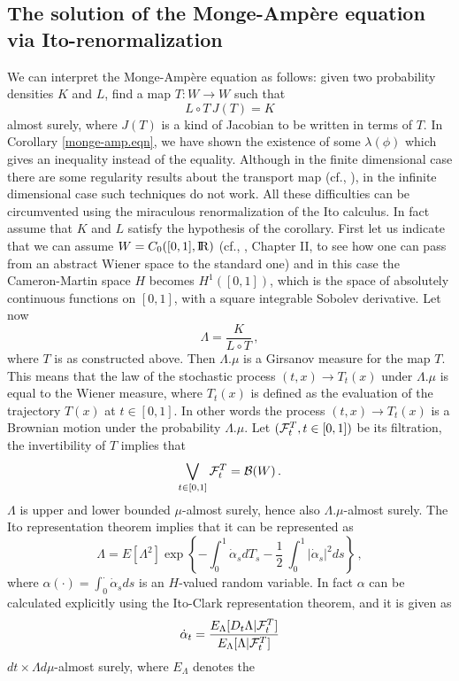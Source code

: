 \documentclass[12pt,a4paper]{book}
\newcommand{\La}{\Lambda}
\newcommand{\la}{\lambda}
\newcommand{\reals}{{\rm I\!R}}
\newcommand{\calB}{{\cal B}}
\newcommand{\calF}{{\cal F}}
\newcommand{\half}{\frac{1}{2}\:}
\begin{document}
\subsection{The solution of the Monge-Amp\`ere equation via
  Ito-renormalization} 
\label{sub-equation}
We can interpret the Monge-Amp\`ere equation as follows: given two
probability densities $K$ and $L$, find a map $T:W\to W$ such that 
$$
L\circ T\, J(T)=K
$$
almost surely, where $J(T)$ is a kind of Jacobian to be written in
terms of $T$. In Corollary \ref{monge-amp.eqn}, we have shown the
existence of some $\la(\phi)$ which gives an inequality instead of the
equality. Although in the finite dimensional case there are some
regularity results about the transport map (cf., \cite{Caf}), in the
infinite dimensional case  such techniques do not work.  All these
difficulties  can
be circumvented using the miraculous 
renormalization of the Ito calculus. In fact assume that $K$ and $L$
satisfy the hypothesis of the corollary. First let us indicate that we
can assume $W=C_0([0,1],\reals)$ (cf., \cite{UZ7}, Chapter II, to see
how one can pass from an abstract Wiener space to the standard
one) and in this case the Cameron-Martin space $H$ becomes
$H^1([0,1])$, which is the space of absolutely continuous functions on
$[0,1]$, with a square integrable Sobolev derivative. Let now 
$$
\La=\frac{K}{L\circ T}\,,
$$
where $T$ is as  constructed above. Then $\La.\mu$ is a Girsanov
measure for the map $T$. This means that the law of the stochastic
process $(t,x)\to T_t(x)$ under $\La.\mu$ is equal to the Wiener
measure, where $T_t(x)$ is defined as the evaluation of the trajectory
$T(x)$ at $t\in [0,1]$. In other words the process $(t,x)\to T_t(x)$
is a Brownian motion under the probability $\La.\mu$. Let
$(\calF^T_t,t\in [0,1])$ be its filtration, the invertibility of  $T$
implies  that 
$$
\bigvee_{t\in [0,1]}\calF^T_t=\calB(W)\,.
$$
 $\La$ is upper and lower  bounded $\mu$-almost surely, hence also
 $\La.\mu$-almost surely. The Ito representation theorem implies that
 it can be represented as 
$$
\La=E[\La^2]\exp\left\{-\int_0^1\dot{\alpha}_sdT_s-\half\int_0^1|\dot{\alpha}_s|^2ds\right\}\,,
$$
where $\alpha(\cdot)=\int_0^\cdot\dot{\alpha}_sds$ is an $H$-valued
random variable. In fact $\alpha$ can be calculated explicitly using
the Ito-Clark representation theorem, and it is
given as 
\begin{equation}
\label{alpha}
\dot{\alpha}_t=\frac{E_\La[D_t\La|\calF^T_t]}{E_\La[\La|\calF^T_t]}
\end{equation}
$dt\times \La d\mu$-almost surely, where $E_\La$ denotes the
\end{document}
